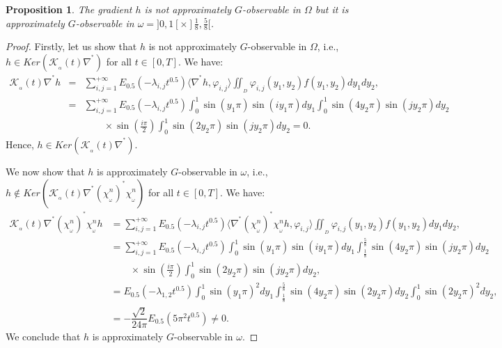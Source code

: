 \documentclass{article}
\newtheorem{proposition}[theorem]{Proposition}
\begin{document}
\begin{proposition}
The gradient $h$ is not approximately $G$-observable in $\Omega$ 
but it is approximately $G$-observable in 
$\omega = ]0,1[\times]\frac{1}{8},\frac{5}{8}[$.
\end{proposition}

\begin{proof}
Firstly, let us show that $h$ is not approximately 
$G$-observable in $\Omega$, i.e., 
$h\in Ker\left(\mathcal{K}_{_\alpha}(t)\nabla^{^*}\right)$
for all $t\in[0,T]$. We have:
$$
\begin{array}{lll}
\mathcal{K}_{_\alpha}(t)\nabla^{^*}h 
&=& \displaystyle\sum_{i,j=1}^{+\infty}
E_{0.5}(-\lambda_{i,j}t^{0.5})\langle \nabla^{^*}h,\varphi_{i,j}\rangle
\displaystyle\iint_{_D}\varphi_{i,j}(y_1,y_2)f(y_1,y_2)dy_1dy_2,\\
& = & \displaystyle\sum_{i,j=1}^{+\infty}
E_{0.5}(-\lambda_{i,j}t^{0.5})\int_{0}^{1}\sin(y_1\pi)
\sin(iy_1\pi)dy_1\int_{0}^{1}\sin(4y_2\pi)\sin(jy_2\pi)dy_2\\
& & \qquad \times \sin(\frac{i\pi}{2})
\displaystyle\int_{0}^{1}\sin(2y_2\pi)\sin(jy_2\pi)dy_2 = 0.
\end{array} 
$$
Hence, $h\in Ker\left(\mathcal{K}_{_\alpha}(t)\nabla^{^*}\right)$.

We now show that $h$ is approximately $G$-observable 
in $\omega$, i.e., $h \notin Ker\left(
\mathcal{K}_{_\alpha}(t)\nabla^{^*}(
\chi_{_\omega}^n)^{^*}\chi_{_\omega}^n\right)$ 
for all $t\in[0,T]$. We have:
\begin{equation*}
\begin{split}
\mathcal{K}_{_\alpha}(t)\nabla^{^*}(\chi_{_\omega}^n)^{^*}\chi_{_\omega}^nh 
&= \displaystyle\sum_{i,j=1}^{+\infty}E_{0.5}(-\lambda_{i,j}t^{0.5})\langle
\nabla^{^*}(\chi_{_\omega}^n)^{^*}\chi_{_\omega}^nh,\varphi_{i,j}\rangle
\displaystyle\iint_{_D}\varphi_{i,j}(y_1,y_2)f(y_1,y_2)dy_1dy_2,\\
&=\displaystyle\sum_{i,j=1}^{+\infty}E_{0.5}(-\lambda_{i,j}t^{0.5})
\int_{0}^{1}\sin(y_1\pi)\sin(iy_1\pi)dy_1\int_{\frac{1}{8}}^{\frac{5}{8}}
\sin(4y_2\pi)\sin(jy_2\pi)dy_2\\
& \qquad \times \sin(\frac{i\pi}{2})
\displaystyle\int_{0}^{1}\sin(2y_2\pi)\sin(jy_2\pi)dy_2,\\
&= E_{0.5}(-\lambda_{1,2}t^{0.5})\displaystyle\int_{0}^{1}\sin(y_1\pi)^2dy_1
\int_{\frac{1}{8}}^{\frac{5}{8}}\sin(4y_2\pi)\sin(2y_2\pi)dy_2
\int_{0}^{1}\sin(2y_2\pi)^2dy_2,\\
&= -\dfrac{\sqrt{2}}{24\pi}E_{0.5}(5\pi^2t^{0.5})\neq 0.
\end{split} 
\end{equation*}
We conclude that $h$ is approximately $G$-observable in $\omega$.
\end{proof}
\end{document}
